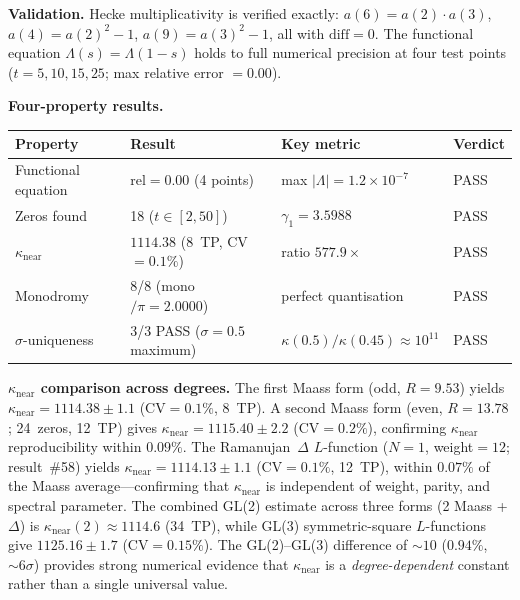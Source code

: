 \documentclass[11pt, a4paper]{article}
\theoremstyle{definition}
\theoremstyle{plain}
\begin{document}
\medskip\noindent
\textbf{Validation.}
Hecke multiplicativity is verified exactly:
$a(6) = a(2)\cdot a(3)$, $a(4) = a(2)^2 - 1$,
$a(9) = a(3)^2 - 1$, all with $\mathrm{diff} = 0$.
The functional equation $\Lambda(s) = \Lambda(1{-}s)$ holds to full
numerical precision at four test points ($t = 5, 10, 15, 25$;
max relative error $= 0.00$).

\medskip\noindent
\textbf{Four-property results.}

\begin{center}
\small
\begin{tabular}{@{}l l l l@{}}
\toprule
Property & Result & Key metric & Verdict \\
\midrule
Functional equation & $\mathrm{rel} = 0.00$ (4 points) & max $|\Lambda|{=}1.2{\times}10^{-7}$ & PASS \\
Zeros found & 18 ($t \in [2, 50]$) & $\gamma_1 = 3.5988$ & PASS \\
$\kappa_{\mathrm{near}}$ & $1114.38$ (8~TP, CV${=}0.1\%$) & ratio $577.9\times$ & PASS \\
Monodromy & 8/8 (mono$/\pi = 2.0000$) & perfect quantisation & PASS \\
$\sigma$-uniqueness & 3/3 PASS ($\sigma{=}0.5$ maximum) & $\kappa(0.5)/\kappa(0.45) \approx 10^{11}$ & PASS \\
\bottomrule
\end{tabular}
\end{center}

\medskip\noindent
\textbf{$\kappa_{\mathrm{near}}$ comparison across degrees.}
The first Maass form (odd, $R{=}9.53$) yields $\kappa_{\mathrm{near}} = 1114.38 \pm 1.1$
(CV${=}0.1\%$, 8~TP).  A second Maass form (even, $R{=}13.78$; 24~zeros, 12~TP) gives
$\kappa_{\mathrm{near}} = 1115.40 \pm 2.2$ (CV${=}0.2\%$), confirming $\kappa_{\mathrm{near}}$
reproducibility within $0.09\%$.
The Ramanujan~$\Delta$ $L$-function ($N{=}1$, weight${=}12$; result~\#58)
yields $\kappa_{\mathrm{near}} = 1114.13 \pm 1.1$ (CV${=}0.1\%$, 12~TP),
within $0.07\%$ of the Maass average---confirming that $\kappa_{\mathrm{near}}$
is independent of weight, parity, and spectral parameter.
The combined GL(2) estimate across three forms (2 Maass + $\Delta$) is
$\kappa_{\mathrm{near}}(2) \approx 1114.6$ (34~TP),
while GL(3) symmetric-square $L$-functions give $1125.16 \pm 1.7$
(CV${=}0.15\%$).  The GL(2)--GL(3) difference of ${\sim}10$ ($0.94\%$, ${\sim}6\sigma$)
provides strong numerical evidence that $\kappa_{\mathrm{near}}$ is a
\emph{degree-dependent} constant rather than a single universal value.
\end{document}
